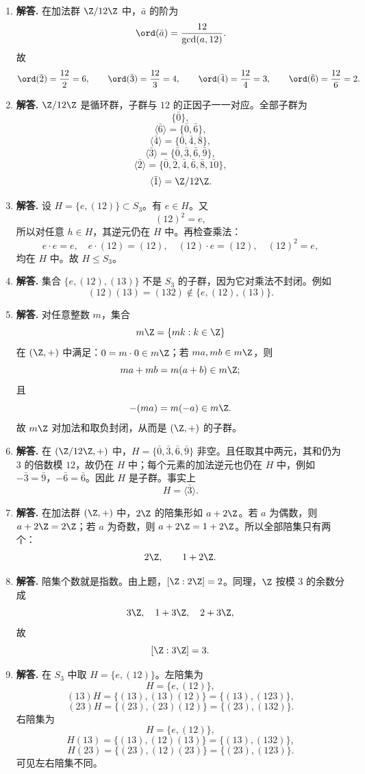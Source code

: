 \begin{enumerate}[label=\textbf{\arabic*.}, leftmargin=*, itemsep=1em]
\item \textbf{解答.} 在加法群 $\Z/12\Z$ 中，$\bar a$ 的阶为
\[
\ord(\bar a)=\frac{12}{\gcd(a,12)}.
\]
故
\[
\ord(\bar2)=\frac{12}{2}=6,\qquad
\ord(\bar3)=\frac{12}{3}=4,\qquad
\ord(\bar4)=\frac{12}{4}=3,\qquad
\ord(\bar6)=\frac{12}{6}=2.
\]

\item \textbf{解答.} $\Z/12\Z$ 是循环群，子群与 $12$ 的正因子一一对应。全部子群为
\[
\{\bar0\},
\]
\[
\langle \bar6\rangle=\{\bar0,\bar6\},
\]
\[
\langle \bar4\rangle=\{\bar0,\bar4,\bar8\},
\]
\[
\langle \bar3\rangle=\{\bar0,\bar3,\bar6,\bar9\},
\]
\[
\langle \bar2\rangle=\{\bar0,\bar2,\bar4,\bar6,\bar8,\bar{10}\},
\]
\[
\langle \bar1\rangle=\Z/12\Z.
\]

\item \textbf{解答.} 设 $H=\{e,(12)\}\subset S_3$。有 $e\in H$。又
\[
(12)^2=e,
\]
所以对任意 $h\in H$，其逆元仍在 $H$ 中。再检查乘法：
\[
e\cdot e=e,\quad e\cdot(12)=(12),\quad (12)\cdot e=(12),\quad (12)^2=e,
\]
均在 $H$ 中。故 $H\le S_3$。

\item \textbf{解答.} 集合 $\{e,(12),(13)\}$ 不是 $S_3$ 的子群，因为它对乘法不封闭。例如
\[
(12)(13)=(132)\notin \{e,(12),(13)\}.
\]

\item \textbf{解答.} 对任意整数 $m$，集合
\[
m\Z=\{mk:k\in\Z\}
\]
在 $(\Z,+)$ 中满足：$0=m\cdot0\in m\Z$；若 $ma,mb\in m\Z$，则
\[
ma+mb=m(a+b)\in m\Z;
\]
且
\[
-(ma)=m(-a)\in m\Z.
\]
故 $m\Z$ 对加法和取负封闭，从而是 $(\Z,+)$ 的子群。

\item \textbf{解答.} 在 $(\Z/12\Z,+)$ 中，$H=\{\bar0,\bar3,\bar6,\bar9\}$ 非空。且任取其中两元，其和仍为 $3$ 的倍数模 $12$，故仍在 $H$ 中；每个元素的加法逆元也仍在 $H$ 中，例如 $-\bar3=\bar9$，$-\bar6=\bar6$。因此 $H$ 是子群。事实上
\[
H=\langle \bar3\rangle.
\]

\item \textbf{解答.} 在加法群 $(\Z,+)$ 中，$2\Z$ 的陪集形如 $a+2\Z$。若 $a$ 为偶数，则 $a+2\Z=2\Z$；若 $a$ 为奇数，则 $a+2\Z=1+2\Z$。所以全部陪集只有两个：
\[
2\Z,\qquad 1+2\Z.
\]

\item \textbf{解答.} 陪集个数就是指数。由上题，$[\Z:2\Z]=2$。同理，$\Z$ 按模 $3$ 的余数分成
\[
3\Z,\quad 1+3\Z,\quad 2+3\Z,
\]
故
\[
[\Z:3\Z]=3.
\]

\item \textbf{解答.} 在 $S_3$ 中取 $H=\{e,(12)\}$。左陪集为
\[
H=\{e,(12)\},
\]
\[
(13)H=\{(13),(13)(12)\}=\{(13),(123)\},
\]
\[
(23)H=\{(23),(23)(12)\}=\{(23),(132)\}.
\]
右陪集为
\[
H=\{e,(12)\},
\]
\[
H(13)=\{(13),(12)(13)\}=\{(13),(132)\},
\]
\[
H(23)=\{(23),(12)(23)\}=\{(23),(123)\}.
\]
可见左右陪集不同。


\end{enumerate}
